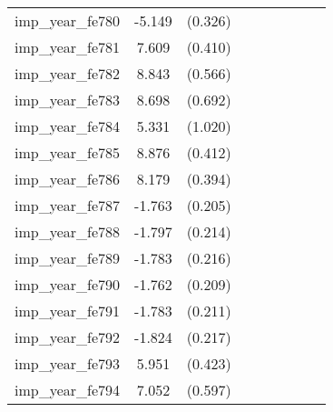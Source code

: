 {\begin{tabular}{l*{4}{cc}}
imp\_year\_fe780&   -5.149\sym{***}&  (0.326)&                  &         &                  &         &                  &         \\
imp\_year\_fe781&    7.609\sym{***}&  (0.410)&                  &         &                  &         &                  &         \\
imp\_year\_fe782&    8.843\sym{***}&  (0.566)&                  &         &                  &         &                  &         \\
imp\_year\_fe783&    8.698\sym{***}&  (0.692)&                  &         &                  &         &                  &         \\
imp\_year\_fe784&    5.331\sym{***}&  (1.020)&                  &         &                  &         &                  &         \\
imp\_year\_fe785&    8.876\sym{***}&  (0.412)&                  &         &                  &         &                  &         \\
imp\_year\_fe786&    8.179\sym{***}&  (0.394)&                  &         &                  &         &                  &         \\
imp\_year\_fe787&   -1.763\sym{***}&  (0.205)&                  &         &                  &         &                  &         \\
imp\_year\_fe788&   -1.797\sym{***}&  (0.214)&                  &         &                  &         &                  &         \\
imp\_year\_fe789&   -1.783\sym{***}&  (0.216)&                  &         &                  &         &                  &         \\
imp\_year\_fe790&   -1.762\sym{***}&  (0.209)&                  &         &                  &         &                  &         \\
imp\_year\_fe791&   -1.783\sym{***}&  (0.211)&                  &         &                  &         &                  &         \\
imp\_year\_fe792&   -1.824\sym{***}&  (0.217)&                  &         &                  &         &                  &         \\
imp\_year\_fe793&    5.951\sym{***}&  (0.423)&                  &         &                  &         &                  &         \\
imp\_year\_fe794&    7.052\sym{***}&  (0.597)&                  &         &                  &         &                  &         \\

\end{tabular}}
